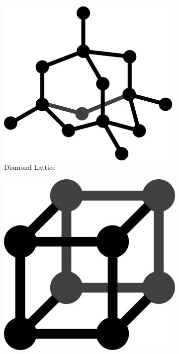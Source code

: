 \begin{figure}[p]
  \centering
  \begin{subfigure}[b]{0.45\textwidth}
    \centering
    \includegraphics[width=\textwidth]{2/Diamond}
    \caption{Diamond Lattice}
    \label{fig:diamond lattice}
  \end{subfigure}
  \hfill
  \begin{subfigure}[b]{0.45\textwidth}
    \centering
    \includegraphics[width=\textwidth]{2/scl}

\end{subfigure}
\end{figure}
